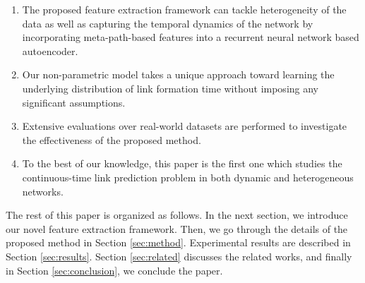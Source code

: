 \begin{enumerate}[label=(\roman*),wide]
\item The proposed feature extraction framework can tackle heterogeneity of the data as well as capturing the temporal dynamics of the network by incorporating meta-path-based features into a recurrent neural network based autoencoder.
\item Our non-parametric model takes a unique approach toward learning the underlying distribution of link formation time without imposing any significant assumptions.
\item Extensive evaluations over real-world datasets are performed to investigate the effectiveness of the proposed method. 
\item To the best of our knowledge, this paper is the first one which studies the continuous-time link prediction problem in both dynamic and heterogeneous networks.
\end{enumerate}

The rest of this paper is organized as follows. In the next section, we introduce our novel feature extraction framework. Then, we go through the details of the proposed \npglm method in Section \ref{sec:method}. Experimental results are described in Section \ref{sec:results}. Section \ref{sec:related} discusses the related works, and finally in Section \ref{sec:conclusion}, we conclude the paper.
